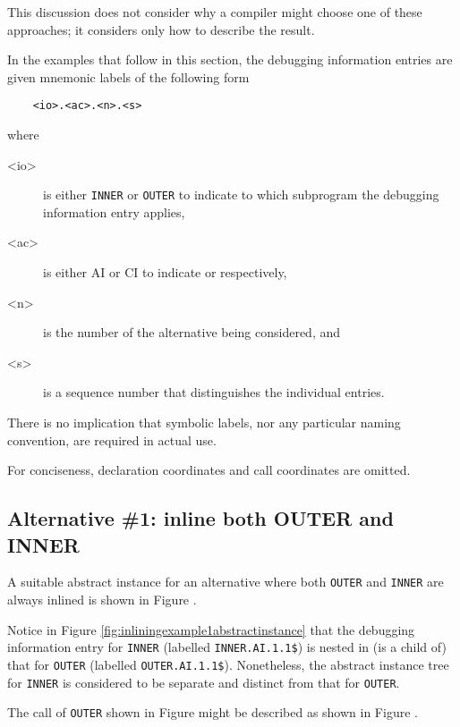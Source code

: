 This discussion does not consider why a compiler might choose
one of these approaches; it considers only how to describe
the result.

In the examples that follow in this section, the debugging
information entries are given mnemonic labels of the following
form
\begin{verbatim}
    <io>.<ac>.<n>.<s>
\end{verbatim}
where
\begin{description}
\item[\textless io\textgreater]
is either \texttt{INNER} or \texttt{OUTER} to indicate to which
subprogram the debugging information entry applies, 
\item[\textless ac\textgreater]
is either AI or CI to indicate  or
 respectively, 
\item[\textless n\textgreater]
is the number of the
alternative being considered, and 
\item[\textless s\textgreater]
is a sequence number that
distinguishes the individual entries. 
\end{description}
There is no implication
that symbolic labels, nor any particular naming convention,
are required in actual use.

For conciseness, declaration coordinates and call coordinates are omitted.

\subsection{Alternative \#1: inline both OUTER and INNER}
\label{app:inlinebothouterandinner}

A suitable abstract instance for an alternative where both
\texttt{OUTER} and \texttt{INNER} are always inlined is shown in 
Figure .

Notice in 
Figure \ref{fig:inliningexample1abstractinstance} 
that the debugging information entry for
\texttt{INNER} (labelled \texttt{INNER.AI.1.1\$}) is nested in (is a child of)
that for \texttt{OUTER} (labelled \texttt{OUTER.AI.1.1\$}). Nonetheless, the
abstract instance tree for \texttt{INNER} is considered to be separate
and distinct from that for \texttt{OUTER}.

The call of \texttt{OUTER} shown in 
Figure 
might be described as
shown in 
Figure .


